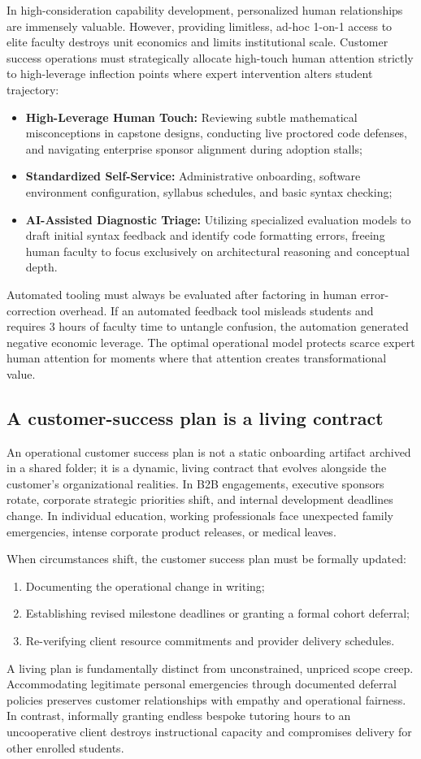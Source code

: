 In high-consideration capability development, personalized human relationships are immensely valuable. However, providing limitless, ad-hoc 1-on-1 access to elite faculty destroys unit economics and limits institutional scale. Customer success operations must strategically allocate high-touch human attention strictly to high-leverage inflection points where expert intervention alters student trajectory:
\begin{itemize}
\item \textbf{High-Leverage Human Touch:} Reviewing subtle mathematical misconceptions in capstone designs, conducting live proctored code defenses, and navigating enterprise sponsor alignment during adoption stalls;
\item \textbf{Standardized Self-Service:} Administrative onboarding, software environment configuration, syllabus schedules, and basic syntax checking;
\item \textbf{AI-Assisted Diagnostic Triage:} Utilizing specialized evaluation models to draft initial syntax feedback and identify code formatting errors, freeing human faculty to focus exclusively on architectural reasoning and conceptual depth.
\end{itemize}
Automated tooling must always be evaluated after factoring in human error-correction overhead. If an automated feedback tool misleads students and requires 3 hours of faculty time to untangle confusion, the automation generated negative economic leverage. The optimal operational model protects scarce expert human attention for moments where that attention creates transformational value.

\subsection{A customer-success plan is a living contract}

An operational customer success plan is not a static onboarding artifact archived in a shared folder; it is a dynamic, living contract that evolves alongside the customer's organizational realities. In B2B engagements, executive sponsors rotate, corporate strategic priorities shift, and internal development deadlines change. In individual education, working professionals face unexpected family emergencies, intense corporate product releases, or medical leaves.

When circumstances shift, the customer success plan must be formally updated:
\begin{enumerate}
\item Documenting the operational change in writing;
\item Establishing revised milestone deadlines or granting a formal cohort deferral;
\item Re-verifying client resource commitments and provider delivery schedules.
\end{enumerate}
A living plan is fundamentally distinct from unconstrained, unpriced scope creep. Accommodating legitimate personal emergencies through documented deferral policies preserves customer relationships with empathy and operational fairness. In contrast, informally granting endless bespoke tutoring hours to an uncooperative client destroys instructional capacity and compromises delivery for other enrolled students.
